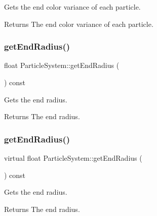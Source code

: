 Gets the end color variance of each particle.

\begin{DoxyReturn}{Returns}
The end color variance of each particle. 
\end{DoxyReturn}
\mbox{\label{classParticleSystem_acae8ff3e7f22dd3e95dd91ca557e84e4}} 
\subsubsection{\texorpdfstring{get\+End\+Radius()}{getEndRadius()}\hspace{0.1cm}{\footnotesize\ttfamily [1/2]}}
{\footnotesize\ttfamily float Particle\+System\+::get\+End\+Radius (\begin{DoxyParamCaption}{ }\end{DoxyParamCaption}) const\hspace{0.3cm}{\ttfamily [virtual]}}

Gets the end radius.

\begin{DoxyReturn}{Returns}
The end radius. 
\end{DoxyReturn}
\mbox{\label{classParticleSystem_ace9c70a68a0429afa7d6adf81bed1b25}} 
\subsubsection{\texorpdfstring{get\+End\+Radius()}{getEndRadius()}\hspace{0.1cm}{\footnotesize\ttfamily [2/2]}}
{\footnotesize\ttfamily virtual float Particle\+System\+::get\+End\+Radius (\begin{DoxyParamCaption}{ }\end{DoxyParamCaption}) const\hspace{0.3cm}{\ttfamily [virtual]}}

Gets the end radius.

\begin{DoxyReturn}{Returns}
The end radius. 
\end{DoxyReturn}
\mbox{\label{classParticleSystem_a0912740bed7df2a34b0669a337d187c6}} 
